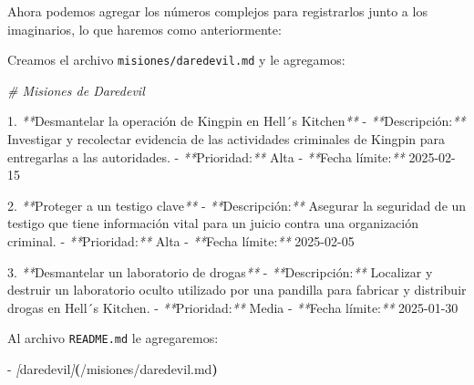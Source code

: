 \documentclass[
]{book}
\newenvironment{Shaded}{\begin{snugshade}}{\end{snugshade}}
\newcommand{\CommentTok}[1]{\textcolor[rgb]{0.56,0.35,0.01}{\textit{#1}}}
\newcommand{\ErrorTok}[1]{\textcolor[rgb]{0.64,0.00,0.00}{\textbf{#1}}}
\newcommand{\ExtensionTok}[1]{#1}
\newcommand{\KeywordTok}[1]{\textcolor[rgb]{0.13,0.29,0.53}{\textbf{#1}}}
\newcommand{\NormalTok}[1]{#1}
\newcommand{\PreprocessorTok}[1]{\textcolor[rgb]{0.56,0.35,0.01}{\textit{#1}}}
\newcommand{\SpecialStringTok}[1]{\textcolor[rgb]{0.31,0.60,0.02}{#1}}
\begin{document}
Ahora podemos agregar los números complejos para registrarlos junto a los imaginarios, lo que haremos como anteriormente:

Creamos el archivo \texttt{misiones/daredevil.md} y le agregamos:

\begin{Shaded}
\begin{Highlighting}[]
\CommentTok{\# Misiones de Daredevil}

\ExtensionTok{1.} \PreprocessorTok{**}\NormalTok{Desmantelar la operación de Kingpin en Hell´s Kitchen}\PreprocessorTok{**}
   \ExtensionTok{{-}} \PreprocessorTok{**}\NormalTok{Descripción:}\PreprocessorTok{**}\NormalTok{ Investigar y recolectar evidencia de las actividades criminales de Kingpin para entregarlas a las autoridades.}
   \ExtensionTok{{-}} \PreprocessorTok{**}\NormalTok{Prioridad:}\PreprocessorTok{**}\NormalTok{ Alta}
   \ExtensionTok{{-}} \PreprocessorTok{**}\NormalTok{Fecha límite:}\PreprocessorTok{**}\NormalTok{ 2025{-}02{-}15}

\ExtensionTok{2.} \PreprocessorTok{**}\NormalTok{Proteger a un testigo clave}\PreprocessorTok{**}
   \ExtensionTok{{-}} \PreprocessorTok{**}\NormalTok{Descripción:}\PreprocessorTok{**}\NormalTok{ Asegurar la seguridad de un testigo que tiene información vital para un juicio contra una organización criminal.}
   \ExtensionTok{{-}} \PreprocessorTok{**}\NormalTok{Prioridad:}\PreprocessorTok{**}\NormalTok{ Alta}
   \ExtensionTok{{-}} \PreprocessorTok{**}\NormalTok{Fecha límite:}\PreprocessorTok{**}\NormalTok{ 2025{-}02{-}05}

\ExtensionTok{3.} \PreprocessorTok{**}\NormalTok{Desmantelar un laboratorio de drogas}\PreprocessorTok{**}
   \ExtensionTok{{-}} \PreprocessorTok{**}\NormalTok{Descripción:}\PreprocessorTok{**}\NormalTok{ Localizar y destruir un laboratorio oculto utilizado por una pandilla para fabricar y distribuir drogas en Hell´s Kitchen.}
   \ExtensionTok{{-}} \PreprocessorTok{**}\NormalTok{Prioridad:}\PreprocessorTok{**}\NormalTok{ Media}
   \ExtensionTok{{-}} \PreprocessorTok{**}\NormalTok{Fecha límite:}\PreprocessorTok{**}\NormalTok{ 2025{-}01{-}30}
\end{Highlighting}
\end{Shaded}

Al archivo \texttt{README.md} le agregaremos:

\begin{Shaded}
\begin{Highlighting}[]
\ExtensionTok{{-}} \PreprocessorTok{[}\SpecialStringTok{daredevil}\PreprocessorTok{]}\ErrorTok{(}\ExtensionTok{/misiones/daredevil.md}\KeywordTok{)}
\end{Highlighting}
\end{Shaded}
\end{document}

